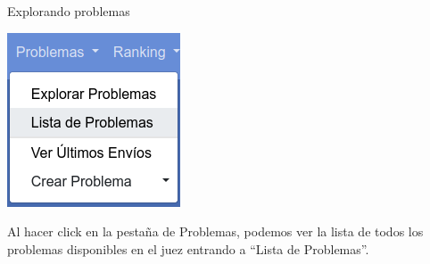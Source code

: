 \documentclass{beamer}
\begin{document}
    \begin{frame}{Explorando problemas}
        \begin{minipage}{.35\linewidth}
            \includegraphics[width=.9\linewidth]{./ou_problem_bar.png}
        \end{minipage}\pause
        \begin{minipage}{.64\linewidth}
            Al hacer click en la pestaña de Problemas, podemos ver la lista de todos los problemas disponibles en el juez entrando a ``Lista de Problemas''.
        \end{minipage}
    \end{frame}
\end{document}
